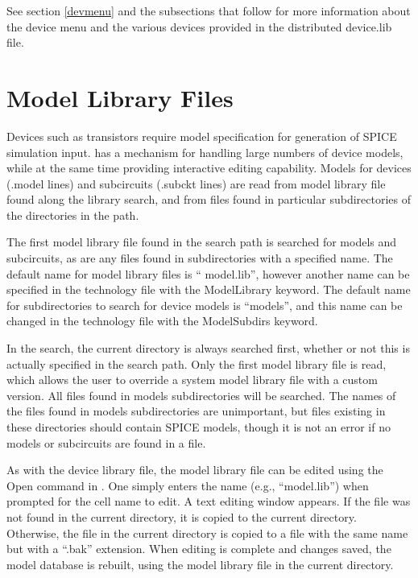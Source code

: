 See section \ref{devmenu} and the subsections that follow for more
information about the device menu and the various devices provided
in the distributed {\vt device.lib} file.
 

\section{Model Library Files}

Devices such as transistors require model specification for generation
of SPICE simulation input.  {\Xic} has a mechanism for handling large
numbers of device models, while at the same time providing interactive
editing capability.  Models for devices ({\vt .model} lines) and
subcircuits ({\vt .subckt} lines) are read from model library file
found along the library search, and from files found in particular
subdirectories of the directories in the path.

The first model library file found in the search path is searched for
models and subcircuits, as are any files found in subdirectories with
a specified name.  The default name for model library files is ``{\vt
model.lib}'', however another name can be specified in the technology
file with the {\vt ModelLibrary} keyword.  The default name for
subdirectories to search for device models is ``{\vt models}'', and
this name can be changed in the technology file with the {\vt
ModelSubdirs} keyword.

In the search, the current directory is always searched first, whether
or not this is actually specified in the search path.  Only the first
model library file is read, which allows the user to override a system
model library file with a custom version.  All files found in {\vt
models} subdirectories will be searched.  The names of the files found
in {\vt models} subdirectories are unimportant, but files existing in
these directories should contain SPICE models, though it is not an
error if no models or subcircuits are found in a file.

As with the device library file, the model library file can be edited
using the {\cb Open} command in {\Xic}.  One simply enters the name
(e.g., ``{\vt model.lib}'') when prompted for the cell name to edit. 
A text editing window appears.  If the file was not found in the
current directory, it is copied to the current directory.  Otherwise,
the file in the current directory is copied to a file with the same
name but with a ``{\vt .bak}'' extension.  When editing is complete
and changes saved, the model database is rebuilt, using the model
library file in the current directory.

